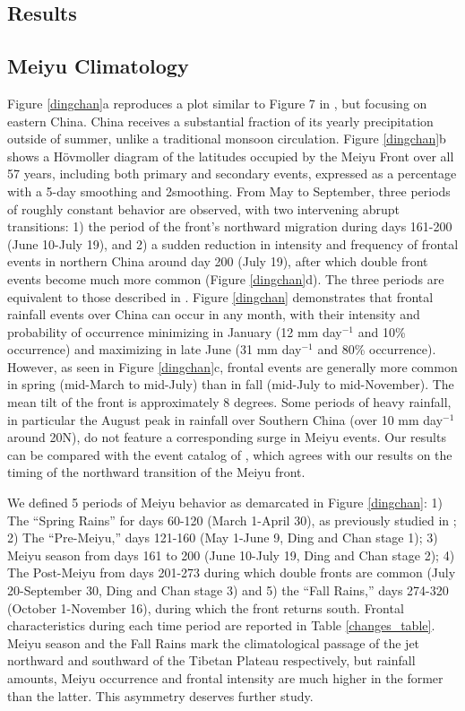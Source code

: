 \documentclass[draft,grl]{AGUTeX}
\begin{document}
\begin{article}
\section{Results}	
	
\subsection{Meiyu Climatology}	

	Figure \ref{dingchan}a reproduces a plot similar to Figure 7 in \citet{Ding2005}, but focusing on eastern China. China receives a substantial fraction of its yearly precipitation outside of summer, unlike a traditional monsoon circulation. Figure \ref{dingchan}b shows a H\"ovmoller diagram of the latitudes occupied by the Meiyu Front over all 57 years, including both primary and secondary events, expressed as a percentage with a 5-day smoothing and 2\textdegree smoothing. From May to September, three periods of roughly constant behavior are observed, with two intervening abrupt transitions: 1) the period of the front's northward migration during days 161-200 (June 10-July 19), and 2) a sudden reduction in intensity and frequency of frontal events in northern China around day 200 (July 19), after which double front events become much more common (Figure \ref{dingchan}d). The three periods are equivalent to those described in \citet{Ding2005}. Figure \ref{dingchan} demonstrates that frontal rainfall events over China can occur in any month, with their intensity and probability of occurrence minimizing in January (12 mm day$^{-1}$ and 10\% occurrence) and maximizing in late June (31 mm day$^{-1}$ and 80\% occurrence). However, as seen in Figure \ref{dingchan}c, frontal events are generally more common in spring (mid-March to mid-July) than in fall (mid-July to mid-November). The mean tilt of the front is approximately 8 degrees. Some periods of heavy rainfall, in particular the August peak in rainfall over Southern China (over 10 mm day$^{-1}$ around 20\textdegree N), do not feature a corresponding surge in Meiyu events. Our results can be compared with the event catalog of \citet{Xu2009}, which agrees with our results on the timing of the northward transition of the Meiyu front.
		
	We defined 5 periods of Meiyu behavior as demarcated in Figure \ref{dingchan}: 1) The ``Spring Rains'' for days 60-120 (March 1-April 30), as previously studied in \citet{Tian1998}; 2) The ``Pre-Meiyu,'' days 121-160 (May 1-June 9, Ding and Chan stage 1); 3) Meiyu season from days 161 to 200 (June 10-July 19, Ding and Chan stage 2); 4) The Post-Meiyu from days 201-273 during which double fronts are common (July 20-September 30, Ding and Chan stage 3) and 5) the ``Fall Rains,'' days 274-320 (October 1-November 16), during which the front returns south. Frontal characteristics during each time period are reported in Table \ref{changes_table}. Meiyu season and the Fall Rains mark the climatological passage of the jet northward and southward of the Tibetan Plateau respectively, but rainfall amounts, Meiyu occurrence and frontal intensity are much higher in the former than the latter. This asymmetry deserves further study.
		

\end{article}
\end{document}

